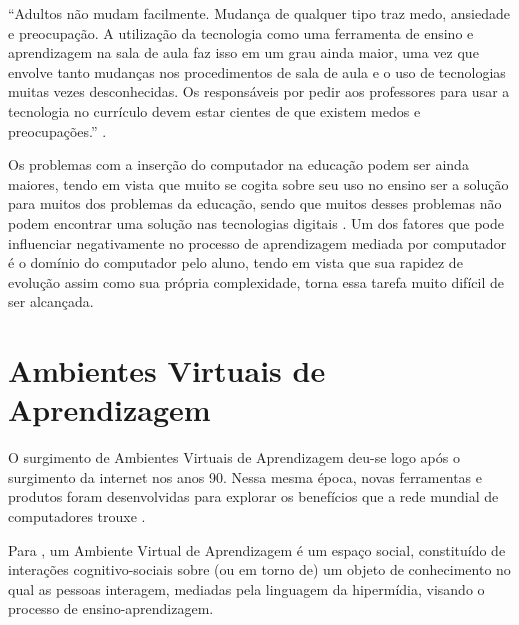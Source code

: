 \begin{citacao}
``Adultos não mudam facilmente. Mudança de qualquer tipo traz medo, ansiedade e preocupação. A utilização da tecnologia como uma ferramenta de ensino e aprendizagem na sala de aula faz isso em um grau ainda maior, uma vez que envolve tanto mudanças nos procedimentos de sala de aula e o uso de tecnologias muitas vezes desconhecidas. Os responsáveis por pedir aos professores para usar a tecnologia no currículo devem estar cientes de que existem medos e preocupações.'' \cite[p.~96, Tradução Livre]{bitner2002integrating}.
\end{citacao}

Os problemas com a inserção do computador na educação podem ser ainda maiores, tendo em vista que muito se cogita sobre seu uso no ensino ser a solução para muitos dos problemas da educação, sendo que muitos desses problemas não podem encontrar uma solução nas tecnologias digitais \cite{silva2009ambiente}. Um dos fatores que pode influenciar negativamente no processo de aprendizagem mediada por computador é o domínio do computador pelo aluno, tendo em vista que sua rapidez de evolução assim como sua própria complexidade, torna essa tarefa muito difícil de ser alcançada.

\section{Ambientes Virtuais de Aprendizagem}

O surgimento de Ambientes Virtuais de Aprendizagem deu-se logo após o surgimento da internet nos anos 90. Nessa mesma época, novas ferramentas e produtos foram desenvolvidas para explorar os benefícios que a rede mundial de computadores trouxe \cite{oleary2002virtual}.

Para , um Ambiente Virtual de Aprendizagem é um espaço social, constituído de interações cognitivo-sociais sobre (ou em torno de) um objeto de conhecimento no qual as pessoas interagem, mediadas pela linguagem da hipermídia, visando o processo de ensino-aprendizagem.


